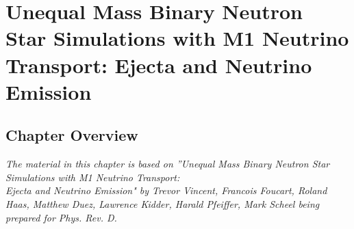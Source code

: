 \chapter{Unequal Mass Binary Neutron Star Simulations with M1 Neutrino Transport: Ejecta and Neutrino Emission}


\section{Chapter Overview}

\textit{The material in this chapter is based on ”Unequal Mass Binary Neutron Star Simulations with M1 Neutrino Transport: \\ Ejecta and Neutrino Emission" by Trevor Vincent, Francois Foucart, Roland Haas, Matthew Duez, Lawrence Kidder, Harald Pfeiffer, Mark Scheel being prepared for Phys. Rev. D.}
